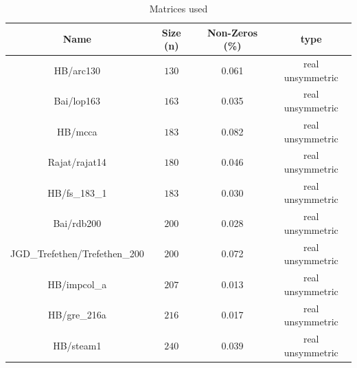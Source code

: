 \begin{table}[ht]
\caption{Matrices used} %
\centering %
\begin{tabular}{c c c c} %
\hline\hline %
Name & Size (n)& Non-Zeros (\%) & type \\ [0.5ex] %
\hline %
HB/arc130 & $130$ & 0.061 & real unsymmetric \\ %
Bai/lop163 & $163$ & 0.035 & real unsymmetric  \\
HB/mcca & $183$ & 0.082 & real unsymmetric  \\
Rajat/rajat14 & $180$ & 0.046 & real unsymmetric  \\
HB/fs_183_1 & $183$ & 0.030 & real unsymmetric  \\
Bai/rdb200 & $200$ & 0.028 & real unsymmetric  \\
JGD_Trefethen/Trefethen_200 & $200$ & 0.072 & real unsymmetric  \\
HB/impcol_a & $207$ & 0.013 & real unsymmetric  \\
HB/gre_216a & $216$ & 0.017 & real unsymmetric  \\
HB/steam1 & $240$ & 0.039 & real unsymmetric  \\ [1ex] %
\hline %
\end{tabular}
\label{table:nonlin} %
\end{table}



